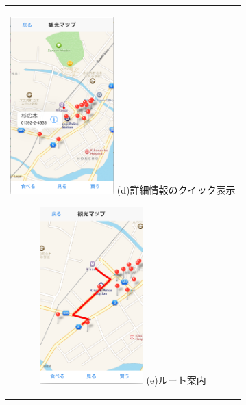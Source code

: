 \begin{figure}[htbp]
  \begin{center}
    \begin{tabular}{c}

      \begin{minipage}{0.33\hsize}
        \begin{center}
\includegraphics[width=4cm, bb=0 0 322 550]{5.3_map1.png}
          \hspace{1cm} (d)詳細情報のクイック表示
        \end{center}
      \end{minipage}

      \begin{minipage}{0.33\hsize}
        \begin{center}
\includegraphics[width=4cm, bb=0 0 321 550]{5.3_map2.png}
          \hspace{1cm} (e)ルート案内
        \end{center}
      \end{minipage}


\end{tabular}
\end{center}
\end{figure}
